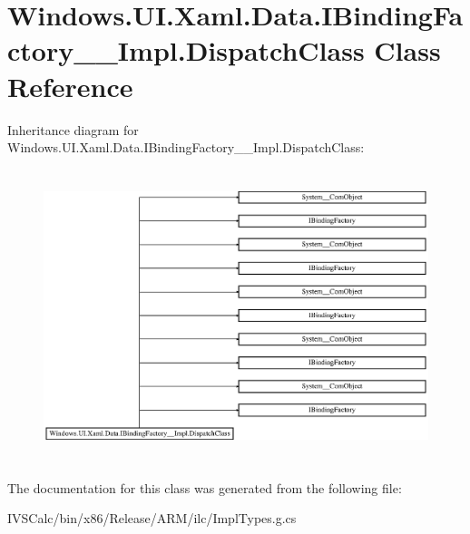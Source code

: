\hypertarget{class_windows_1_1_u_i_1_1_xaml_1_1_data_1_1_i_binding_factory_____impl_1_1_dispatch_class}{}\section{Windows.\+U\+I.\+Xaml.\+Data.\+I\+Binding\+Factory\+\_\+\+\_\+\+Impl.\+Dispatch\+Class Class Reference}
\label{class_windows_1_1_u_i_1_1_xaml_1_1_data_1_1_i_binding_factory_____impl_1_1_dispatch_class}
Inheritance diagram for Windows.\+U\+I.\+Xaml.\+Data.\+I\+Binding\+Factory\+\_\+\+\_\+\+Impl.\+Dispatch\+Class\+:\begin{figure}[H]
\begin{center}
\leavevmode
\includegraphics[height=8.555555cm]{class_windows_1_1_u_i_1_1_xaml_1_1_data_1_1_i_binding_factory_____impl_1_1_dispatch_class}
\end{center}
\end{figure}


The documentation for this class was generated from the following file\+:\begin{DoxyCompactItemize}
\item 
I\+V\+S\+Calc/bin/x86/\+Release/\+A\+R\+M/ilc/Impl\+Types.\+g.\+cs\end{DoxyCompactItemize}
